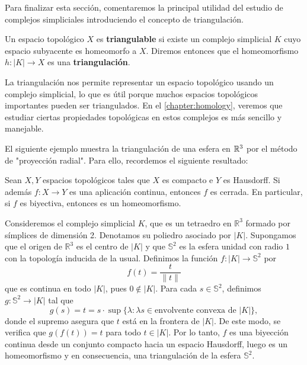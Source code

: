 Para finalizar esta sección, comentaremos la principal utilidad del estudio de complejos simpliciales introduciendo el concepto de triangulación.

\begin{definicion}
	Un espacio topológico $X$ es \textbf{triangulable} si existe un complejo
	simplicial $K$ cuyo espacio subyacente es homeomorfo a $X$. Diremos entonces que
	el homeomorfismo $h: |K| \rightarrow X$ es una \textbf{triangulación}.
\end{definicion}

La triangulación nos permite representar un espacio topológico usando un complejo simplicial, lo que es útil porque muchos espacios topológicos importantes pueden ser triangulados. En el \autoref{chapter:homology}, veremos que estudiar ciertas propiedades topológicas en estos complejos es más sencillo y manejable.

El siguiente ejemplo muestra la triangulación de una esfera en $\mathbb{R}^3$ por el método de "proyección radial". Para ello, recordemos el siguiente resultado:

\begin{proposicion}
	\label{lem:closed-map}
	Sean $X,Y$ espacios topológicos tales que $X$ es compacto e $Y$ es Hausdorff. Si además $f: X\to Y$ es una aplicación continua, entonces $f$ es cerrada. En particular, si $f$ es biyectiva, entonces es un homeomorfismo.
\end{proposicion}

\begin{ejemplo}
	Consideremos el complejo simplicial \(K\), que es un tetraedro en \(\mathbb{R}^3\) formado por símplices de dimensión 2. Denotamos su poliedro asociado por \(|K|\). Supongamos que el origen de \(\mathbb{R}^3\) es el centro de \(|K|\) y que \(\mathbb{S}^2\) es la esfera unidad con radio \(1\) con la topología inducida de la usual. Definimos la función \(f: |K| \to \mathbb{S}^2\) por
	\[
	f(t) = \frac{t}{\|t\|}
	\]
	que es continua en todo \(|K|\), pues \(0 \not \in |K|\). Para cada \(s \in \mathbb{S}^2\), definimos \(g: \mathbb{S}^2 \to |K|\) tal que
	\[
	g(s) = t = s \cdot \sup\{\lambda : \lambda s \in \text{envolvente convexa de }|K|\},
	\]
	donde el supremo asegura que \(t\) está en la frontera de \(|K|\). De este modo, se verifica que \(g(f(t)) = t\) para todo \(t \in |K|\). Por lo tanto, \(f\) es una biyección continua desde un conjunto compacto hacia un espacio Hausdorff, luego es un homeomorfismo y en consecuencia, una triangulación de la esfera $\mathbb{S}^2$.
\end{ejemplo}


